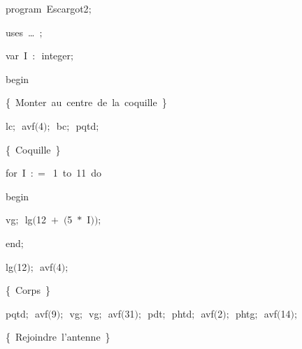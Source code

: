 
{
\parindent {}
\medskip

\carrenoir
\vspace{\neglskip}\mbox{\blc  \idt  \mcl program\idt \label{prog:Escargot2}\ Escargot2$;$
}\par 
\vspace{\neglskip}\mbox{\blc \blk\idt \mcl uses\idt \ \ldots\ $;$
}\par 
\pagebreak[3] 
\vspace{\neglskip}\mbox{\blc  \blk\idt  \mcl var\idt \ I\ $:$\ integer$;$}\par 
\vspace{\neglskip}\mbox{\blc  \idt  \mcl begin\idt }\par 
\vspace{\neglskip}\mbox{\blc  \blk\idt  \cmt  \{\ Monter\ au\ centre\ de\ la\ coquille\ \}\idt }\par 
\vspace{\neglskip}\mbox{\blc  \blk\idt  lc$;$\ avf$($4$)$$;$\ bc$;$\ pqtd$;$}\par 
\vspace{\neglskip}\mbox{\blc  \blk\idt  \cmt  \{\ Coquille\ \}\idt }\par 
\pagebreak[3] 
\vspace{\neglskip}\mbox{\blc  \blk\idt  \mcl for\idt \ I\ $:$$=$\ 1\ \mcl to\idt \ 11\ \mcl do\idt }\par 
\vspace{\neglskip}\mbox{\blc  \blk\blk\idt  \mcl begin\idt }\par 
\vspace{\neglskip}\mbox{\blc  \blk\blk\blk\idt  vg$;$\ lg$($12\ $+$\ $($5\ $\ast$\ I$)$$)$$;$}\par 
\vspace{\neglskip}\mbox{\blc  \blk\blk\idt  \mcl end\idt $;$}\par 
\vspace{\neglskip}\mbox{\blc  \blk\idt  lg$($12$)$$;$\ avf$($4$)$$;$}\par 
\vspace{\neglskip}\mbox{\blc  \blk\idt  \cmt  \{\ Corps\ \}\idt }\par 
\vspace{\neglskip}\mbox{\blc  \blk\idt  pqtd$;$\ avf$($9$)$$;$\ vg$;$\ vg$;$\ avf$($31$)$$;$\ pdt$;$\ phtd$;$\ avf$($2$)$$;$\ phtg$;$\ avf$($14$)$$;$}\par 
\vspace{\neglskip}\mbox{\blc  \blk\idt  \cmt  \{\ Rejoindre\ l{'}antenne\ \}\idt }\par 
}
